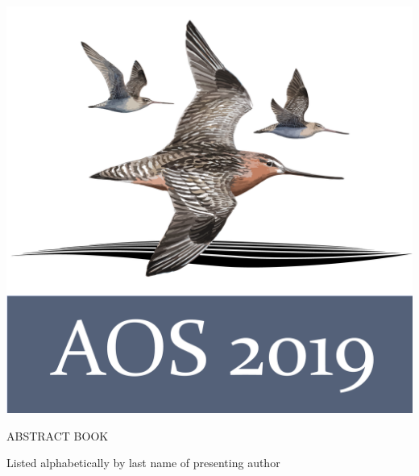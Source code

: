\documentclass[twoside]{article}
\begin{document}

\thispagestyle{empty}
\pagestyle{fancy}

\setlength{\parindent}{0cm}

\newcommand\normaltalk[3]{%
	\begin{samepage}
	\textbf{#1}
	
	\vspace{12pt}
	
	#2

	\vspace{12pt}
	\end{samepage}
	
        #3
	
	\begin{center}
        \noindent\rule{2cm}{0.4pt}	
        \end{center}
        
}


\vspace{20pt}
\begin{center}
    \includegraphics[width=\textwidth]{AOS2019Logo.png}
    
    \vspace{20pt}
    
    \huge{ABSTRACT BOOK}
   
    \vspace{20pt}
    
    \huge{Listed alphabetically by last name of presenting author}
    
    \tableofcontents

	
\end{center}
\end{document}

